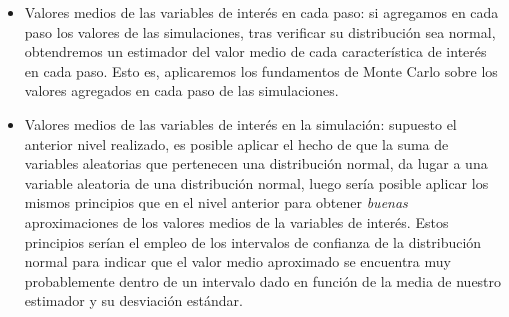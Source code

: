 \documentclass[../proyecto.tex]{memoir}
\begin{document}
\begin{itemize}
\item Valores medios de las variables de interés en cada paso: si agregamos en cada paso los valores de las simulaciones, tras verificar su distribución sea normal, obtendremos un estimador del valor medio de cada característica de interés en cada paso. Esto es, aplicaremos los fundamentos de Monte Carlo sobre los valores agregados en cada paso de las simulaciones.

\item Valores medios de las variables de interés en la simulación: supuesto el anterior nivel realizado, es posible aplicar el hecho de que la suma de variables aleatorias que pertenecen una distribución normal, da lugar a una variable aleatoria de una distribución normal, luego sería posible aplicar los mismos principios que en el nivel anterior para obtener \textit{buenas} aproximaciones de los valores medios de la variables de interés. Estos principios serían el empleo de los intervalos de confianza de la distribución normal para indicar que el valor medio aproximado se encuentra muy probablemente dentro de un intervalo dado en función de la media de nuestro estimador y su desviación estándar.
\end{itemize}
\end{document}
